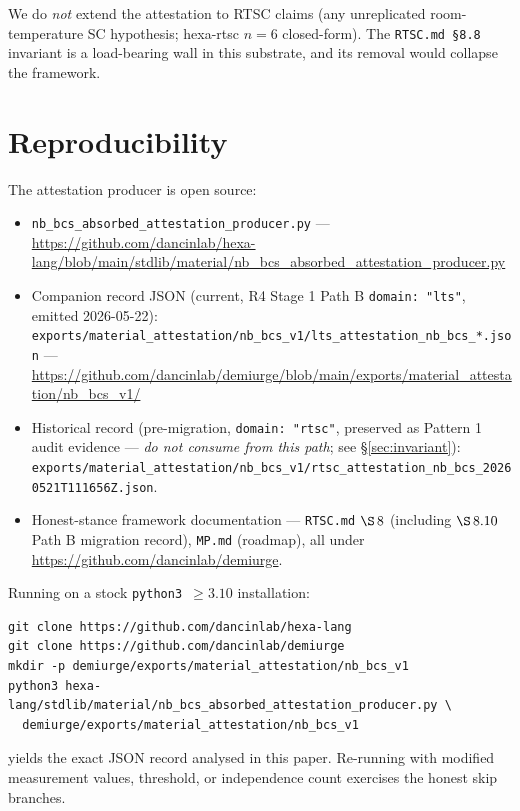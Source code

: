\documentclass[11pt,a4paper]{article}
\begin{document}
We do \emph{not} extend the attestation to RTSC claims (any
unreplicated room-temperature SC hypothesis; hexa-rtsc \(n=6\)
closed-form). The \texttt{RTSC.md \S 8.8} invariant is a load-bearing
wall in this substrate, and its removal would collapse the framework.

\section*{Reproducibility}

The attestation producer is open source:
\begin{itemize}
\item \texttt{nb\_bcs\_absorbed\_attestation\_producer.py} ---
  \url{https://github.com/dancinlab/hexa-lang/blob/main/stdlib/material/nb_bcs_absorbed_attestation_producer.py}
\item Companion record JSON (current, R4 Stage 1 Path B
  \texttt{domain: "lts"}, emitted 2026-05-22):
  \texttt{exports/material\_attestation/nb\_bcs\_v1/lts\_attestation\_nb\_bcs\_*.json}
  ---
  \url{https://github.com/dancinlab/demiurge/blob/main/exports/material_attestation/nb_bcs_v1/}
\item Historical record (pre-migration, \texttt{domain: "rtsc"},
  preserved as Pattern 1 audit evidence ---
  \emph{do not consume from this path}; see \S\ref{sec:invariant}):
  \texttt{exports/material\_attestation/nb\_bcs\_v1/rtsc\_attestation\_nb\_bcs\_20260521T111656Z.json}.
\item Honest-stance framework documentation ---
  \texttt{RTSC.md} \(\S\,8\) (including \(\S\,8.10\) Path B
  migration record), \texttt{MP.md} (roadmap), all under
  \url{https://github.com/dancinlab/demiurge}.
\end{itemize}

Running on a stock \texttt{python3 \(\ge 3.10\)} installation:
\begin{verbatim}
git clone https://github.com/dancinlab/hexa-lang
git clone https://github.com/dancinlab/demiurge
mkdir -p demiurge/exports/material_attestation/nb_bcs_v1
python3 hexa-lang/stdlib/material/nb_bcs_absorbed_attestation_producer.py \
  demiurge/exports/material_attestation/nb_bcs_v1
\end{verbatim}
yields the exact JSON record analysed in this paper. Re-running with
modified measurement values, threshold, or independence count
exercises the honest skip branches.
\end{document}
